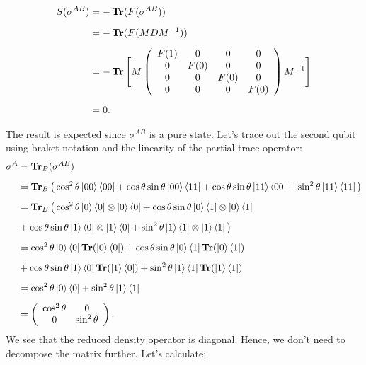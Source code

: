 \begin{itemize}
\begin{align}
S(\sigma^{AB}) &= -\operatorname{\textup{\textbf{Tr}}}(F(\sigma^{AB})) \nonumber \\[0.5em]
&= -\operatorname{\textup{\textbf{Tr}}} (F(MDM^{-1})) \nonumber \\[0.5em]
&=-\operatorname{\textup{\textbf{Tr}}} \Bigg[
M
\left( \begin{array}{cccc}
 F(1) & 0 & 0 & 0 \\
 0 & F(0) & 0 & 0 \\
 0 & 0 & F(0) & 0 \\
 0 & 0 & 0 & F(0) \\
\end{array}
\right)
M^{-1}
\Bigg]
\nonumber\\[0.5em]
&=0.
\end{align}

The result is expected since $\sigma^{AB}$ is a pure state.
Let's trace out the second qubit using braket notation and the linearity of the partial trace operator: 
\begin{align}
\sigma^A &= \operatorname{\textup{\textbf{Tr}}}_B (\sigma^{AB}) \nonumber \\[0.5em]
&= \operatorname{\textup{\textbf{Tr}}}_B \big( \cos^2 \theta \ket{00} \bra{00}+ \cos \theta \sin\theta \ket{00} \bra{11} + \cos \theta \sin \theta \ket{11} \bra{00} + \sin^2 \theta \ket{11} \bra{11} \big) \nonumber \\[0.5em]
&= \operatorname{\textup{\textbf{Tr}}}_B \big(\cos^2 \theta \ket{0} \bra{0} \otimes \ket{0} \bra{0} + \cos \theta \sin\theta \ket{0} \bra{1} \otimes \ket{0} \bra{1} \nonumber \\[0.5em] &+ \cos \theta \sin\theta \ket{1} \bra{0} \otimes \ket{1} \bra{0} +\sin^2 \theta \ket{1} \bra{1} \otimes \ket{1} \bra{1} 
\big) \nonumber \\[0.5em]
&=
\cos^2 \theta \ket{0} \bra{0} \operatorname{\textup{\textbf{Tr}}} (\ket{0} \bra{0}) + \cos \theta \sin \theta \ket{0} \bra{1} \operatorname{\textup{\textbf{Tr}}} ( \ket{0} \bra{1}) \nonumber \\[0.5em] &+ \cos \theta \sin\theta \ket{1} \bra{0} \operatorname{\textup{\textbf{Tr}}} ( \ket{1} \bra{0} ) + \sin^2 \theta \ket{1} \bra{1} \operatorname{\textup{\textbf{Tr}}}( \ket{1} \bra{1} )
\nonumber \\[0.5em]
&= \cos^2 \theta \ket{0} \bra{0}
+\sin^2 \theta \ket{1} \bra{1}
\nonumber \\[0.5em] &=
\left( \begin{array}{cccc}
 \cos^2 \theta & 0  \\
 0 & \sin^2 \theta  \\
\end{array}
\right).
\end{align}
We see that the reduced density operator is diagonal. Hence, we don't need to decompose the matrix further. Let's calculate:

\end{itemize}

